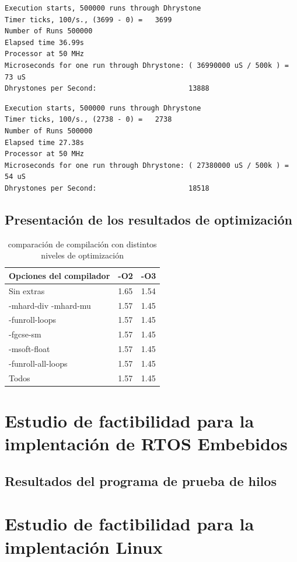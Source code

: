 \begin{lstlisting}[frame=single,caption={Optimización nivel -O2},label={lst:salidas},breaklines]
Execution starts, 500000 runs through Dhrystone
Timer ticks, 100/s., (3699 - 0) =	3699
Number of Runs 500000
Elapsed time 36.99s
Processor at 50 MHz
Microseconds for one run through Dhrystone: ( 36990000 uS / 500k ) = 73 uS
Dhrystones per Second:                      13888 
\end{lstlisting}

\begin{lstlisting}[frame=single,caption={Optimización nivel -O3},label={lst:salidas},breaklines]
Execution starts, 500000 runs through Dhrystone
Timer ticks, 100/s., (2738 - 0) =	2738
Number of Runs 500000
Elapsed time 27.38s
Processor at 50 MHz
Microseconds for one run through Dhrystone: ( 27380000 uS / 500k ) = 54 uS
Dhrystones per Second:                      18518 
\end{lstlisting}


	\subsection {Presentación de los resultados de optimización} 
\begin{table}[!h]
\begin{center}
\begin{tabular}{ |l |l| l|}
\hline
\rowcolor[gray]{0.8} Opciones del compilador&-O2&-O3 \\
\hline
Sin extras 					&1.65 			&1.54\\
\hline
-mhard-div -mhard-mu 	& 1.57			&1.45 \\
\hline
-funroll-loops			 	& 1.57			& 1.45 \\
\hline
-fgcse-sm					& 1.57			& 1.45 \\
\hline
-msoft-float 				& 1.57			&1.45  \\
\hline
-funroll-all-loops	 		& 1.57			& 1.45 \\
\hline
Todos	 					& 1.57			& 1.45 \\
\hline
\end{tabular}
\end{center}
\caption{comparación de compilación con distintos niveles de optimización}
\end{table}



	\section{Estudio de factibilidad para la implentación de RTOS Embebidos}
	

		\subsection{Resultados del programa de prueba de hilos}
		
			
		
		\section{Estudio de factibilidad para la implentación Linux}
	
	
	 